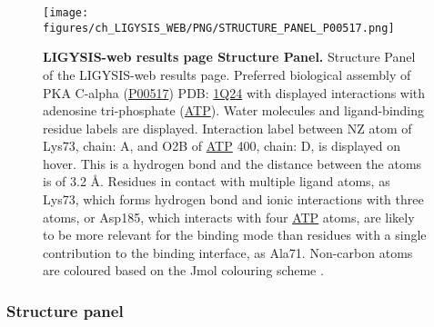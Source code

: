 \begin{figure}[htb!]
    \centering
    \texttt{[image: figures/ch\_LIGYSIS\_WEB/PNG/STRUCTURE\_PANEL\_P00517.png]}
    \caption[LIGYSIS-web results page Structure Panel]{\textbf{LIGYSIS-web results page Structure Panel.} Structure Panel of the LIGYSIS-web results page. Preferred biological assembly of PKA C-alpha (\href{https://www.uniprot.org/uniprotkb/P00517/entry}{P00517}) PDB: \href{https://www.ebi.ac.uk/pdbe/entry/pdb/1Q24}{1Q24} \cite{GAEL_2003_AKT} with displayed interactions with adenosine tri-phosphate (\href{https://www.ebi.ac.uk/pdbe-srv/pdbechem/chemicalCompound/show/ATP}{ATP}). Water molecules and ligand-binding residue labels are displayed. Interaction label between NZ atom of Lys73, chain: A, and O2B of \href{https://www.ebi.ac.uk/pdbe-srv/pdbechem/chemicalCompound/show/ATP}{ATP} 400, chain: D, is displayed on hover. This is a hydrogen bond and the distance between the atoms is of 3.2 \AA{}. Residues in contact with multiple ligand atoms, as Lys73, which forms hydrogen bond and ionic interactions with three atoms, or Asp185, which interacts with four \href{https://www.ebi.ac.uk/pdbe-srv/pdbechem/chemicalCompound/show/ATP}{ATP} atoms, are likely to be more relevant for the binding mode than residues with a single contribution to the binding interface, as Ala71. Non-carbon atoms are coloured based on the Jmol colouring scheme \cite{JMOL}.}
    \label{fig:LIGYSIS_web_STRUCTURE_PANEL}
\end{figure}

\subsubsection{Structure panel}

